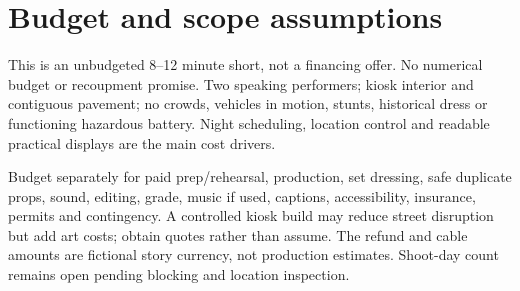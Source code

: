 \section{Budget and scope assumptions}
This is an unbudgeted 8–12 minute short, not a financing offer. No numerical budget or recoupment promise. Two speaking performers; kiosk interior and contiguous pavement; no crowds, vehicles in motion, stunts, historical dress or functioning hazardous battery. Night scheduling, location control and readable practical displays are the main cost drivers.

Budget separately for paid prep/rehearsal, production, set dressing, safe duplicate props, sound, editing, grade, music if used, captions, accessibility, insurance, permits and contingency. A controlled kiosk build may reduce street disruption but add art costs; obtain quotes rather than assume. The refund and cable amounts are fictional story currency, not production estimates. Shoot-day count remains open pending blocking and location inspection.
